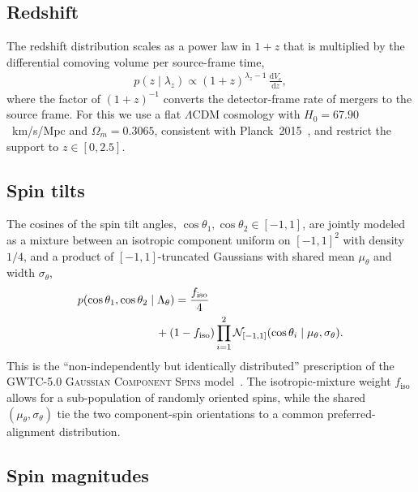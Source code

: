 \documentclass[aps,prd,reprint,twocolumn,10pt,eqsecnum,showpacs,nofootinbib,amsfonts,amssymb,amsmath,longbibliography,superscriptaddress,floatfix]{revtex4-1}
\begin{document}
\subsection{Redshift}
\label{sec:appendix-z}

The redshift distribution scales as a power law in $1+z$ that is multiplied by the differential comoving volume per source-frame time,
\begin{align}
\label{eq:redshift-density}
p(z \mid \lambda_{z}) \propto (1 + z)^{\lambda_{z} - 1}\, \frac{\mathrm{d} V_{c}}{\mathrm{d} z},
\end{align}
where the factor of $(1+z)^{-1}$ converts the detector-frame rate of mergers to the source frame. For this we use a flat $\Lambda$CDM cosmology with $H_{0} = 67.90$~km/s/Mpc and $\Omega_{m} = 0.3065$, consistent with Planck~2015~\cite{Planck:2015fie}, and restrict the support to $z \in [0, 2.5]$.

\subsection{Spin tilts}
\label{sec:appendix-tilt}

The cosines of the spin tilt angles, $\cos \theta_{1}, \cos \theta_{2} \in [-1, 1]$, are jointly modeled as a mixture between an isotropic component uniform on $[-1, 1]^{2}$ with density $1/4$, and a product of $[-1, 1]$-truncated Gaussians with shared mean $\mu_{\theta}$ and width $\sigma_{\theta}$,
\begin{align}
\label{eq:tilt-density}
p(\cos \theta_{1}, \cos \theta_{2} \mid \Lambda_\theta) =\;& \frac{f_{\mathrm{iso}}}{4}  \\
&\hspace{-30pt} + (1 - f_{\mathrm{iso}}) \prod_{i=1}^{2} \mathcal{N}_{[-1, 1]}(\cos \theta_{i} \mid \mu_{\theta}, \sigma_{\theta}). \nonumber
\end{align}
This is the ``non-independently but identically distributed'' prescription of the GWTC-5.0 \textsc{Gaussian Component Spins} model~\cite{LIGOScientific:2026ctl}. The isotropic-mixture weight $f_{\mathrm{iso}}$ allows for a sub-population of randomly oriented spins, while the shared $(\mu_{\theta}, \sigma_{\theta})$ tie the two component-spin orientations to a common preferred-alignment distribution.

\subsection{Spin magnitudes}
\label{sec:appendix-spin}
\end{document}
